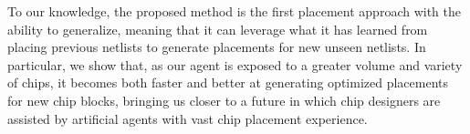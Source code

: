 \documentclass{article}
\begin{document}

To our knowledge, the proposed method is the first placement approach with the ability to generalize, meaning that it can leverage what it has learned from placing previous netlists to generate placements for new unseen netlists. In particular, we show that, as our agent is exposed to a greater volume and variety of chips, it becomes both faster and better at generating optimized placements for new chip blocks, bringing us closer to a future in which chip designers are assisted by artificial agents with vast chip placement experience. 

 
\end{document}
